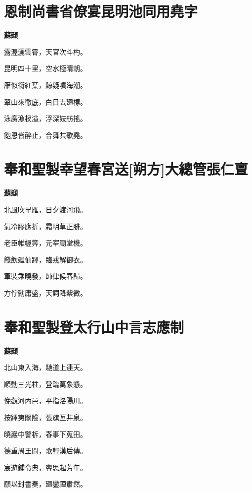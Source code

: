 \documentclass[12pt,a4paper]{ctexbook}
\begin{document}
\section{恩制尚書省僚宴昆明池同用堯字}
\textbf{蘇頲}\par\vspace{0.5em}
露渥灑雲霄，天官次斗杓。\par
昆明四十里，空水極晴朝。\par
雁似銜紅葉，鯨疑噴海潮。\par
翠山來徹底，白日去廻標。\par
泳廣漁杈溢，浮深妓舫搖。\par
飽恩皆醉止，合舞共歌堯。\par

\section{奉和聖製幸望春宮送[朔方]大總管張仁亶}
\textbf{蘇頲}\par\vspace{0.5em}
北風吹早雁，日夕渡河飛。\par
氣冷膠應折，霜明草正腓。\par
老臣帷幄筭，元宰廟堂機。\par
餞飲廻仙蹕，臨戎解御衣。\par
軍裝乘曉發，師律候春歸。\par
方佇勳庸盛，天詞降紫微。\par

\section{奉和聖製登太行山中言志應制}
\textbf{蘇頲}\par\vspace{0.5em}
北山東入海，馳道上連天。\par
順動三光柱，登臨萬象懸。\par
俛觀河內邑，平指洛陽川。\par
按蹕夷關險，張旗亙井泉。\par
曉巖中警柝，春事下蒐田。\par
德重周王問，歌輕漢后傳。\par
宸遊鋪令典，睿思起芳年。\par
願以封書奏，廻鑾禪肅然。\par
\end{document}
